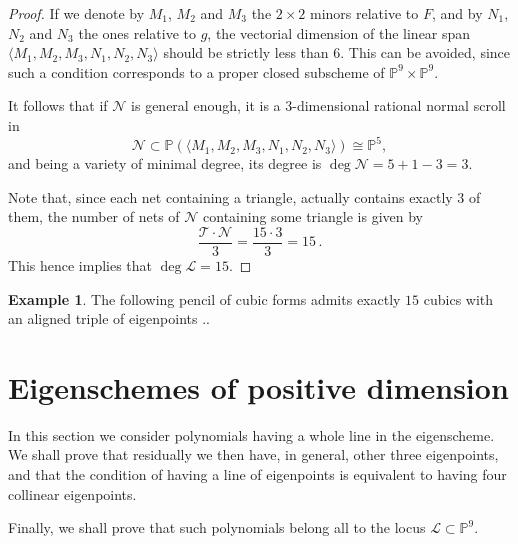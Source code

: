 \documentclass{amsart}
\theoremstyle{plain}
\theoremstyle{definition}
\newtheorem{es}[lemma]{Example}
\newcommand{\p}{\mathbb{P}}
\newcommand{\sL}{\mathcal{L}}
\begin{document}
{\begin{proof}
{If we denote by $M_1$, $M_2$ and $M_3$ the $2 \times 2$ minors relative to $F$, and by $N_1$, $N_2$ and $N_3$ the ones relative to $g$, the vectorial dimension of the linear span
$\langle M_1,M_2,M_3,N_1,N_2,N_3
\rangle$ should be strictly less than $6$. This can be avoided, since such a condition corresponds to a proper closed subscheme of $\p^9 \times \p^9$.

It follows that if ${\mathcal N}$ is general enough, it is a $3$-dimensional rational normal scroll in
$$
{\mathcal N}\subset \p(\langle M_1,M_2,M_3,N_1,N_2,N_3
\rangle) \cong \p^5,
$$
and being a variety of minimal degree, its degree is $\deg {\mathcal N}=5+1-3=3$.
}
%
%
%
%
%
%

Note that, since each net containing a triangle, actually contains exactly $3$ of them, the number of nets of ${\mathcal N}$ containing some triangle is given by
%
\[
\frac {{\mathcal T} \cdot {\mathcal N}}{3} =\frac{{15} \cdot {3}}{3}=15 \,.
\]
%
This hence implies that $\deg {\mathcal L} = 15$.
\end{proof}

\begin{es}
The following pencil of cubic forms admits exactly $15$ cubics with an aligned triple of eigenpoints ..
\end{es}

}
\section{Eigenschemes of positive dimension}
\label{positive_dim}
In this section we consider polynomials having a whole line in the eigenscheme. We shall prove that residually we then have, in general, other three eigenpoints, and that the condition of having a line of eigenpoints is equivalent to having four collinear eigenpoints.

Finally, we shall prove that such polynomials belong all to the locus $\sL \subset \p^9$.
\end{document}
